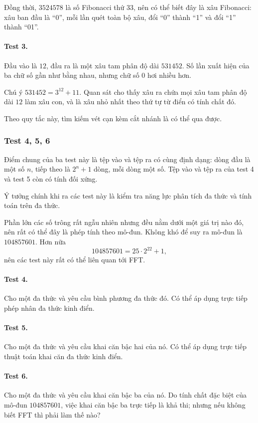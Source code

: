\documentclass[11pt]{article}
\begin{document}
Đồng thời, \(3524578\) là số Fibonacci thứ \(33\), nên có thể biết đây là xâu
Fibonacci: xâu ban đầu là ``0'', mỗi lần quét toàn bộ xâu, đổi ``0'' thành
``1'' và đổi ``1'' thành ``01''.

\paragraph{Test 3.}
Đầu vào là \(12\), đầu ra là một xâu tam phân độ dài \(531452\). Số lần xuất
hiện của ba chữ số gần như bằng nhau, nhưng chữ số \(0\) hơi nhiều hơn.

Chú ý \(531452=3^{12}+11\). Quan sát cho thấy xâu ra chứa mọi xâu tam phân độ
dài \(12\) làm xâu con, và là xâu nhỏ nhất theo thứ tự từ điển có tính chất đó.

Theo quy tắc này, tìm kiếm vét cạn kèm cắt nhánh là có thể qua được.

\subsubsection{Test 4, 5, 6}

Điểm chung của ba test này là tệp vào và tệp ra có cùng định dạng: dòng đầu là
một số \(n\), tiếp theo là \(2^n+1\) dòng, mỗi dòng một số. Tệp vào và tệp ra
của test 4 và test 5 còn có tính đối xứng.

Ý tưởng chính khi ra các test này là kiểm tra năng lực phân tích đa thức và
tính toán trên đa thức.

Phần lớn các số trông rất ngẫu nhiên nhưng đều nằm dưới một giá trị nào đó, nên
rất có thể đây là phép tính theo mô-đun. Không khó để suy ra mô-đun là
\(104857601\). Hơn nữa
\[
  104857601=25\cdot 2^{22}+1,
\]
nên các test này rất có thể liên quan tới FFT.

\paragraph{Test 4.}
Cho một đa thức và yêu cầu bình phương đa thức đó. Có thể áp dụng trực tiếp
phép nhân đa thức kinh điển.

\paragraph{Test 5.}
Cho một đa thức và yêu cầu khai căn bậc hai của nó. Có thể áp dụng trực tiếp
thuật toán khai căn đa thức kinh điển.

\paragraph{Test 6.}
Cho một đa thức và yêu cầu khai căn bậc ba của nó. Do tính chất đặc biệt của
mô-đun \(104857601\), việc khai căn bậc ba trực tiếp là khả thi; nhưng nếu
không biết FFT thì phải làm thế nào?
\end{document}
